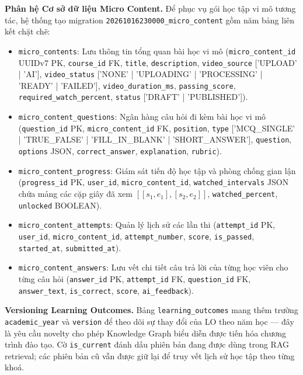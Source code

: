 \textbf{Phân hệ Cơ sở dữ liệu Micro Content.}
Để phục vụ gói học tập vi mô tương tác, hệ thống tạo migration \texttt{20261016230000\_micro\_content} gồm năm bảng liên kết chặt chẽ:
\begin{itemize}
    \item \texttt{micro\_contents}: Lưu thông tin tổng quan bài học vi mô (\texttt{micro\_content\_id} UUIDv7 PK, \texttt{course\_id} FK, \texttt{title}, \texttt{description}, \texttt{video\_source} ['UPLOAD' | 'AI'], \texttt{video\_status} ['NONE' | 'UPLOADING' | 'PROCESSING' | 'READY' | 'FAILED'], \texttt{video\_duration\_ms}, \texttt{passing\_score}, \texttt{required\_watch\_percent}, \texttt{status} ['DRAFT' | 'PUBLISHED']).
    \item \texttt{micro\_content\_questions}: Ngân hàng câu hỏi đi kèm bài học vi mô (\texttt{question\_id} PK, \texttt{micro\_content\_id} FK, \texttt{position}, \texttt{type} ['MCQ\_SINGLE' | 'TRUE\_FALSE' | 'FILL\_IN\_BLANK' | 'SHORT\_ANSWER'], \texttt{question}, \texttt{options} JSON, \texttt{correct\_answer}, \texttt{explanation}, \texttt{rubric}).
    \item \texttt{micro\_content\_progress}: Giám sát tiến độ học tập và phòng chống gian lận (\texttt{progress\_id} PK, \texttt{user\_id}, \texttt{micro\_content\_id}, \texttt{watched\_intervals} JSON chứa mảng các cặp giây đã xem $[[s_1, e_1], [s_2, e_2]]$, \texttt{watched\_percent}, \texttt{unlocked} BOOLEAN).
    \item \texttt{micro\_content\_attempts}: Quản lý lịch sử các lần thi (\texttt{attempt\_id} PK, \texttt{user\_id}, \texttt{micro\_content\_id}, \texttt{attempt\_number}, \texttt{score}, \texttt{is\_passed}, \texttt{started\_at}, \texttt{submitted\_at}).
    \item \texttt{micro\_content\_answers}: Lưu vết chi tiết câu trả lời của từng học viên cho từng câu hỏi (\texttt{answer\_id} PK, \texttt{attempt\_id} FK, \texttt{question\_id} FK, \texttt{answer\_text}, \texttt{is\_correct}, \texttt{score}, \texttt{ai\_feedback}).
\end{itemize}

\textbf{Versioning Learning Outcomes.} Bảng \texttt{learning\_outcomes} mang
thêm trường \texttt{academic\_year} và \texttt{version} để theo dõi sự thay
đổi của LO theo năm học --- đây là yêu cầu novelty cho phép Knowledge Graph
biểu diễn được tiến hóa chương trình đào tạo. Cờ \texttt{is\_current} đánh
dấu phiên bản đang được dùng trong RAG retrieval; các phiên bản cũ vẫn được
giữ lại để truy vết lịch sử học tập theo từng khoá.

